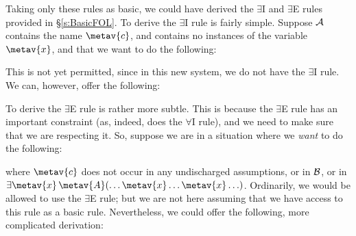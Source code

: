 Taking only these rules as basic, we could have derived the  $\exists$I and $\exists$E rules provided in \S\ref{s:BasicFOL}. To derive the $\exists$I rule is fairly simple. Suppose $\mathcal{A}$ contains the name $\metav{c}$, and contains no instances of the variable $\metav{x}$, and that we want to do the following:
\begin{fitchproof}
\end{fitchproof}
This is not yet permitted, since in this new system, we do not have the $\exists$I rule. We can, however, offer the following:
\begin{fitchproof}
	\PR
	\open
		\AS
	\close
\end{fitchproof}\noindent
To derive the $\exists$E rule is rather more subtle. This is because the $\exists$E rule has an important constraint (as, indeed, does the $\forall$I rule), and we need to make sure that we are respecting it. So, suppose we are in a situation where we \emph{want} to do the following:
\begin{fitchproof}
	\open
		\AS
	\close
\end{fitchproof}\noindent
 where $\metav{c}$ does not occur in any undischarged assumptions, or in $\mathcal{B}$, or in $\exists \metav{x}\, \metav{A}(\ldots \metav{x} \ldots \metav{x}\ldots)$. Ordinarily, we would be allowed to use the $\exists$E rule; but we are not here assuming that we have access to this rule as a basic rule. Nevertheless, we could offer the following, more complicated derivation:
 
